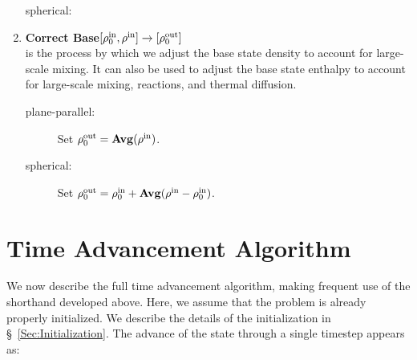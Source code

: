 \begin{enumerate}
\begin{description}
\item[spherical:] 

\end{description}

\item {\bf Correct Base}$[\rho_0^{\mathrm{in}}, \rho^{\mathrm{in}}] \rightarrow [\rho_0^{\mathrm{out}}]$\\
is the process by which we adjust the base state density to account for
large-scale mixing.  It can also be used to adjust the base state enthalpy
to account for large-scale mixing, reactions, and thermal diffusion.

\begin{description}
\item[plane-parallel:] Set $\rho_0^{\mathrm{out}} = {\bf Avg}(\rho^{\mathrm{in}})$.
\item[spherical:] Set $\rho_0^{\mathrm{out}} = \rho_0^{\mathrm{in}} + {\bf Avg}(\rho^{\mathrm{in}} - \rho_0^{\mathrm{in}})$.
\end{description}

\end{enumerate}


\section{Time Advancement Algorithm}\label{Sec:Time Advancement Algorithm}

We now describe the full time advancement algorithm, making frequent
use of the shorthand developed above.  Here, we assume that the
problem is already properly initialized.  We describe the details of
the initialization in \S~\ref{Sec:Initialization}.
The advance of the state through a single timestep appears as:


